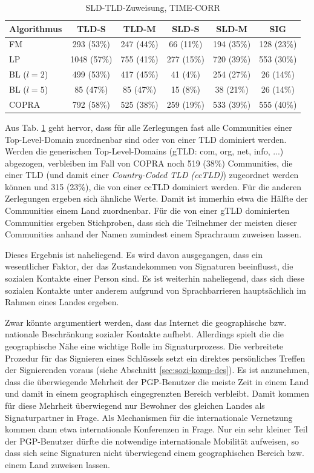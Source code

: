 \begin{table}[h]
  \centering
  \footnotesize
  \begin{tabular}{l|c|c|c|c|c}
    Algorithmus & TLD-S & TLD-M & SLD-S & SLD-M & SIG \\
    \hline
    FM & 293 (53\%) & 247 (44\%) & 66 (11\%) & 194 (35\%) & 128
    (23\%) \\
    \hline
    LP & 1048 (57\%) & 755 (41\%) & 277 (15\%) & 720 (39\%) &
    553 (30\%) \\
    \hline
    BL ($l=2$) & 499 (53\%) & 417 (45\%) & 41 (4\%) & 254 (27\%) & 26
    (14\%) \\
    \hline
    BL ($l=5$) & 85 (47\%) & 85 (47\%) & 15 (8\%) & 38 (21\%) & 26
    (14\%) \\
    \hline
    COPRA & 792 (58\%) & 525 (38\%) & 259 (19\%) & 533 (39\%) & 555 (40\%)

  \end{tabular}
  \caption{SLD-TLD-Zuweisung, TIME-CORR}
  \label{tab:assign}
\end{table}

Aus Tab. \ref{tab:assign} geht hervor, dass f\"ur alle Zerlegungen
fast alle Communities einer Top-Level-Domain zuordnenbar sind oder von
einer TLD dominiert werden. Werden die generischen Top-Level-Domains
(gTLD: com, org, net, info, ...) abgezogen, verbleiben im Fall von COPRA
noch 519 (38\%) Communities, die einer TLD (und damit einer
\emph{Country-Coded TLD (ccTLD)}) zugeordnet werden k\"onnen und 315
(23\%), die von einer ccTLD dominiert werden. F\"ur die anderen
Zerlegungen ergeben sich \"ahnliche Werte. Damit ist immerhin etwa die
H\"alfte der Communities einem Land zuordnenbar. F\"ur die von einer
gTLD dominierten Communities ergeben Stichproben, dass sich die
Teilnehmer der meisten dieser Communities anhand der Namen zumindest
einem Sprachraum zuweisen lassen.

Dieses Ergebnis ist naheliegend. Es wird davon ausgegangen, dass ein
wesentlicher Faktor, der das Zustandekommen von Signaturen
beeinflusst, die sozialen Kontakte einer Person sind. Es ist weiterhin
naheliegend, dass sich diese sozialen Kontakte unter anderem aufgrund
von Sprachbarrieren haupts\"achlich im Rahmen eines Landes ergeben. 

Zwar k\"onnte argumentiert werden, dass das Internet die geographische
bzw. nationale Beschr\"ankung sozialer Kontakte aufhebt. Allerdings
spielt die die geographische N\"ahe eine wichtige Rolle im
Signaturprozess. Die verbreitete Prozedur f\"ur das Signieren eines
Schl\"ussels setzt ein direktes pers\"onliches Treffen der
Signierenden voraus (siehe Abschnitt \ref{sec:sozi-komp-des}). Es ist
anzunehmen, dass die \"uberwiegende Mehrheit der PGP-Benutzer die
meiste Zeit in einem Land und damit in einem geographisch
eingegrenzten Bereich verbleibt. Damit kommen f\"ur diese Mehrheit
\"uberwiegend nur Bewohner des gleichen Landes als Signaturpartner in
Frage. Als Mechanismen f\"ur die internationale Vernetzung kommen dann
etwa internationale Konferenzen in Frage. Nur ein sehr kleiner Teil
der PGP-Benutzer d\"urfte die notwendige internationale Mobilit\"at
aufweisen, so dass sich seine Signaturen nicht \"uberwiegend einem
geographischen Bereich bzw. einem Land zuweisen lassen.

